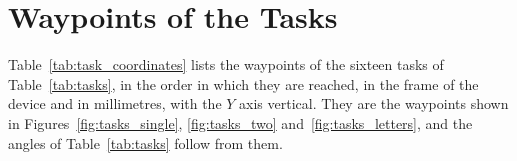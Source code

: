 \documentclass[12pt]{report}
\begin{document}
\printbibliography[heading=bibnumbered]

\appendix
\chapter{Waypoints of the Tasks}
\label{app:task_coordinates}
Table~\ref{tab:task_coordinates} lists the waypoints of the sixteen tasks of Table~\ref{tab:tasks}, in the order in which they are reached, in the frame of the device and in millimetres, with the $Y$ axis vertical. They are the waypoints shown in Figures~\ref{fig:tasks_single}, \ref{fig:tasks_two} and~\ref{fig:tasks_letters}, and the angles of Table~\ref{tab:tasks} follow from them.
\end{document}
